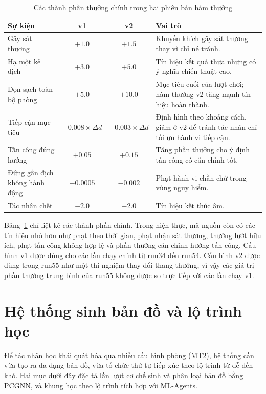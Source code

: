 \begin{table}[H]
    \centering
    \small
    \caption{Các thành phần thưởng chính trong hai phiên bản hàm thưởng}
    \label{tab:reward_components}
    \begin{tabular}{|p{4.4cm}|c|c|p{5.2cm}|}
        \hline
        \textbf{Sự kiện} & \textbf{v1} & \textbf{v2} & \textbf{Vai trò} \\
        \hline
        Gây sát thương & $+1.0$ & $+1.5$ & Khuyến khích gây sát thương thay vì chỉ né tránh. \\
        \hline
        Hạ một kẻ địch & $+3.0$ & $+5.0$ & Tín hiệu kết quả thưa nhưng có ý nghĩa chiến thuật cao. \\
        \hline
        Dọn sạch toàn bộ phòng & $+5.0$ & $+10.0$ & Mục tiêu cuối của lượt chơi; hàm thưởng v2 tăng mạnh tín hiệu hoàn thành. \\
        \hline
        Tiếp cận mục tiêu & $+0.008 \times \Delta d$ & $+0.003 \times \Delta d$ & Định hình theo khoảng cách, giảm ở v2 để tránh tác nhân chỉ tối ưu hành vi tiếp cận. \\
        \hline
        Tấn công đúng hướng & $+0.05$ & $+0.15$ & Tăng phần thưởng cho ý định tấn công có căn chỉnh tốt. \\
        \hline
        Đứng gần địch không hành động & $-0.0005$ & $-0.002$ & Phạt hành vi chần chừ trong vùng nguy hiểm. \\
        \hline
        Tác nhân chết & $-2.0$ & $-2.0$ & Tín hiệu kết thúc âm. \\
        \hline
    \end{tabular}
\end{table}

Bảng~\ref{tab:reward_components} chỉ liệt kê các thành phần chính. Trong hiện thực, mã nguồn còn có các tín hiệu nhỏ hơn như phạt theo thời gian, phạt nhận sát thương, thưởng lướt hữu ích, phạt tấn công không hợp lệ và phần thưởng căn chỉnh hướng tấn công. Cấu hình v1 được dùng cho các lần chạy chính từ run34 đến run54. Cấu hình v2 được dùng trong run55 như một thí nghiệm thay đổi thang thưởng, vì vậy các giá trị phần thưởng trung bình của run55 không được so trực tiếp với các lần chạy v1.

\section{Hệ thống sinh bản đồ và lộ trình học}

Để tác nhân học khái quát hóa qua nhiều cấu hình phòng (MT2), hệ thống cần vừa tạo ra đa dạng bản đồ, vừa tổ chức thứ tự tiếp xúc theo lộ trình từ dễ đến khó. Hai mục dưới đây đặc tả lần lượt cơ chế sinh và phân loại bản đồ bằng PCGNN, và khung học theo lộ trình tích hợp với ML-Agents.

